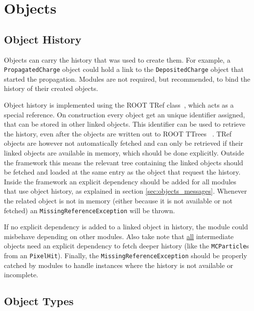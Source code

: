 \section{Objects}
\label{sec:objects}

\subsection{Object History}
\label{sec:objhistory}

Objects can carry the history that was used to create them. 
For example, a \texttt{PropagatedCharge} object could hold a link to the \texttt{DepositedCharge} object that started the propagation.
Modules are not required, but recommended, to bind the history of their created objects.

Object history is implemented using the ROOT TRef class~\cite{roottref}, which acts as a special reference. 
On construction every object get an unique identifier assigned, that can be stored in other linked objects.
This identifier can be used to retrieve the history, even after the objects are written out to ROOT TTrees ~\cite{roottree}.
TRef objects are however not automatically fetched and can only be retrieved if their linked objects are available in memory, which should be done explicitly.
Outside the framework this means the relevant tree containing the linked objects should be fetched and loaded at the same entry as the object that request the history.
Inside the framework an explicit dependency should be added for all modules that use object history, as explained in section \ref{sec:objects_messages}.
Whenever the related object is not in memory (either because it is not available or not fetched) an \texttt{MissingReferenceException} will be thrown. 

\begin{warning}
    If no explicit dependency is added to a linked object in history, the module could misbehave depending on other modules. 
    Also take note that \underline{all} intermediate objects need an explicit dependency to fetch deeper history (like the \texttt{MCParticle}s from an \texttt{PixelHit}). 
    Finally, the \texttt{MissingReferenceException} should be properly catched by modules to handle instances where the history is not available or incomplete.
\end{warning}

\subsection{Object Types}
\label{sec:objtypes}

